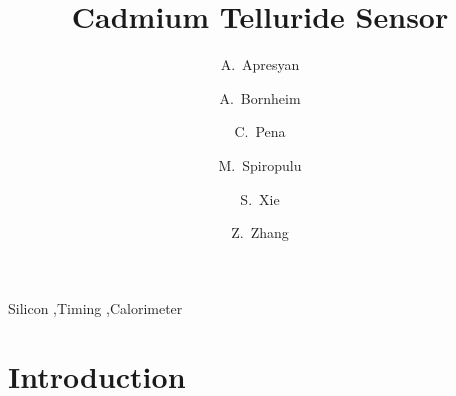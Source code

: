 \documentclass[preprint,1p]{elsarticle}
\begin{document}
\linenumbers

\begin{frontmatter}



\title{Cadmium Telluride Sensor}


\author[2]{A.~Apresyan}
\author[1]{A.~Bornheim}
\author[1]{C.~Pena}
\author[1]{M.~Spiropulu}
\author[1]{S.~Xie}
\author[1]{Z.~Zhang}
\address[1]{California Institute of Technology, Pasadena, CA, USA}
\address[2]{Fermi National Accelerator Laboratory, Batavia, IL, USA}

\begin{abstract}


\end{abstract}

\begin{keyword}

Silicon \sep Timing \sep Calorimeter

\end{keyword}

\end{frontmatter}


\section{Introduction} 
\end{document}
